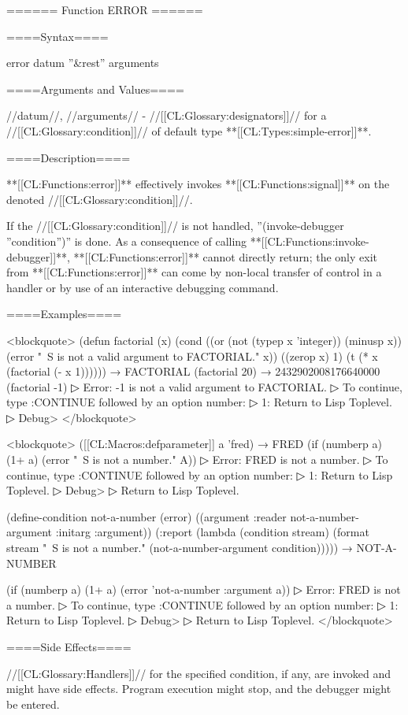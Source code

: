 ====== Function ERROR ======

====Syntax====

\DefunNoReturn error {datum ''&rest'' arguments}

====Arguments and Values====

//datum//, //arguments// - //[[CL:Glossary:designators]]// for a //[[CL:Glossary:condition]]// of default type **[[CL:Types:simple-error]]**.

====Description====

**[[CL:Functions:error]]** effectively invokes **[[CL:Functions:signal]]** on the denoted //[[CL:Glossary:condition]]//.

If the //[[CL:Glossary:condition]]// is not handled, ''(invoke-debugger ''condition'')'' is done. As a consequence of calling **[[CL:Functions:invoke-debugger]]**, **[[CL:Functions:error]]** cannot directly return; the only exit from **[[CL:Functions:error]]** can come by non-local transfer of control in a handler or by use of an interactive debugging command.

====Examples====

<blockquote> (defun factorial (x) (cond ((or (not (typep x 'integer)) (minusp x)) (error "~S is not a valid argument to FACTORIAL." x)) ((zerop x) 1) (t (* x (factorial (- x 1)))))) → FACTORIAL (factorial 20) → 2432902008176640000 (factorial -1)
▷ Error: -1 is not a valid argument to FACTORIAL.
▷ To continue, type :CONTINUE followed by an option number:
▷ 1: Return to Lisp Toplevel.
▷ Debug> </blockquote>

<blockquote> ([[CL:Macros:defparameter]] a 'fred) → FRED (if (numberp a) (1+ a) (error "~S is not a number." A))
▷ Error: FRED is not a number.
▷ To continue, type :CONTINUE followed by an option number:
▷ 1: Return to Lisp Toplevel.
▷ Debug> 
▷ Return to Lisp Toplevel.

(define-condition not-a-number (error) ((argument :reader not-a-number-argument :initarg :argument)) (:report (lambda (condition stream) (format stream "~S is not a number." (not-a-number-argument condition))))) → NOT-A-NUMBER

(if (numberp a) (1+ a) (error 'not-a-number :argument a))
▷ Error: FRED is not a number.
▷ To continue, type :CONTINUE followed by an option number:
▷ 1: Return to Lisp Toplevel.
▷ Debug> 
▷ Return to Lisp Toplevel. </blockquote>

====Side Effects====

//[[CL:Glossary:Handlers]]// for the specified condition, if any, are invoked and might have side effects. Program execution might stop, and the debugger might be entered.

